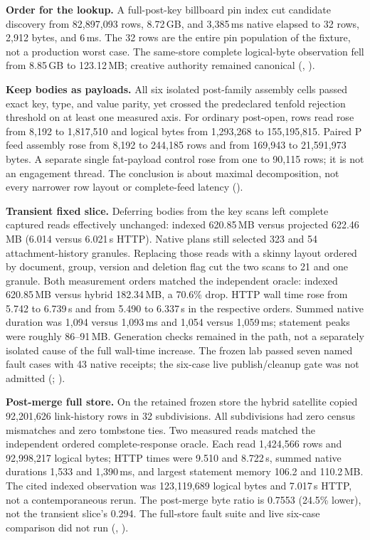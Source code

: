 \textbf{Order for the lookup.} A full-post-key billboard pin index cut
candidate discovery from 82,897,093 rows, 8.72\,GB, and 3,385\,ms native
elapsed to 32 rows, 2,912 bytes, and 6\,ms. The 32 rows are the entire
pin population of the fixture, not a production worst case. The same-store
complete logical-byte observation fell from 8.85\,GB to 123.12\,MB;
creative authority remained canonical
(, ).

\textbf{Keep bodies as payloads.} All six isolated post-family assembly
cells passed exact key, type, and value parity, yet crossed the predeclared
tenfold rejection threshold on at least one measured axis. For ordinary
post-open, rows read rose from 8,192 to 1,817,510 and logical bytes from
1,293,268 to 155,195,815. Paired P feed assembly rose from 8,192 to 244,185
rows and from 169,943 to 21,591,973 bytes. A separate single fat-payload
control rose from one to 90,115 rows; it is not an engagement thread.
The conclusion is about maximal decomposition, not every narrower
row layout or complete-feed latency
().

\textbf{Transient fixed slice.} Deferring bodies from the key scans left
complete captured reads effectively unchanged: indexed 620.85\,MB versus
projected 622.46\,MB (6.014 versus 6.021\,s HTTP). Native plans still
selected 323 and 54 attachment-history granules. Replacing those reads
with a skinny layout ordered by document, group, version and deletion flag
cut the two scans to 21 and one granule. Both measurement orders matched
the independent oracle: indexed 620.85\,MB versus hybrid 182.34\,MB,
a 70.6\% drop. HTTP wall time rose from 5.742 to 6.739\,s and from
5.490 to 6.337\,s in the respective orders. Summed native duration was
1,094 versus 1,093\,ms and 1,054 versus 1,059\,ms; statement peaks were
roughly 86--91\,MB. Generation checks remained in the path, not a
separately isolated cause of the full wall-time increase. The frozen lab
passed seven named fault cases with 43 native receipts; the six-case live
publish/cleanup gate was not admitted
(;
).

\textbf{Post-merge full store.} On the retained frozen store the hybrid
satellite copied 92,201,626 link-history rows in 32 subdivisions. All
subdivisions had zero census mismatches and zero tombstone ties. Two
measured reads matched the independent ordered complete-response oracle.
Each read 1,424,566 rows and 92,998,217 logical bytes; HTTP times were
9.510 and 8.722\,s, summed native durations 1,533 and 1,390\,ms, and
largest statement memory 106.2 and 110.2\,MB. The cited indexed
observation was 123,119,689 logical bytes and 7.017\,s HTTP, not a
contemporaneous rerun. The post-merge byte ratio is 0.7553 (24.5\% lower),
not the transient slice's 0.294. The full-store fault suite and live
six-case comparison did not run
(, ).
